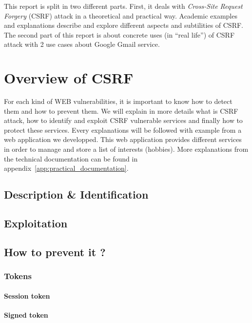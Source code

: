 \documentclass[a4paper,11pt]{report}
\newcommand{\csrf}{\textit{Cross-Site Request Forgery}}
\begin{document}
  This report is split in two different parts. First, it deals with \csrf{} (CSRF) attack in 
  a theoretical and practical way. Academic examples and explanations describe and explore 
  different aspects and subtilities of CSRF. The second part of this report is about concrete 
  uses (in ``real life'') of CSRF attack with 2 use cases about Google Gmail service.

  \section{Overview of CSRF}
  
  For each kind of WEB vulnerabilities, it is important to know how to detect them and 
  how to prevent them. We will explain in more details what is CSRF attack, how to 
  identify and exploit CSRF vulnerable services and finally how to protect these services. 
  Every explanations will be followed with example from a web application we developped. 
  This web application provides different services in order to manage and store a list of 
  interests (hobbies). More explanations from the technical documentation can be found 
  in appendix~\ref{app:practical_documentation}.
  
  \subsection{Description \& Identification}
  
  \subsection{Exploitation}
  
  \subsection{How to prevent it ?}
  
  \subsubsection{Tokens}
  
  \paragraph{Session token} %
  \paragraph{Signed token} %
  
\end{document}

